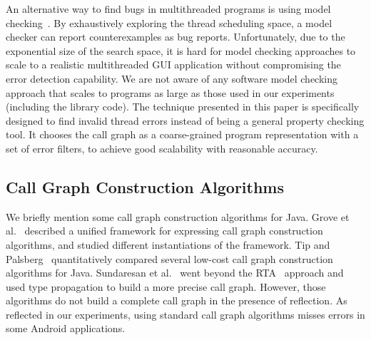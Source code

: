 An alternative way to find bugs in multithreaded programs is using model checking~\cite{Nori:2010:ESO, Inverardi:2000, Siegel:2008}.
By exhaustively exploring the thread scheduling space, a model checker can
report counterexamples as bug reports.
Unfortunately, due to the exponential size of the search space,
it is hard for model checking approaches to scale to a realistic multithreaded GUI application
 without compromising the error detection capability. 
We are not aware of any software model checking approach that scales to programs
as large as those used in our experiments (including the library code).
The technique presented in this paper is specifically designed to find invalid thread
errors instead of being a general property checking tool. 
It chooses the call graph as a coarse-grained program representation with a
set of error filters, to achieve good scalability with reasonable accuracy.


\tinystep

\subsection{Call Graph Construction Algorithms}

We briefly mention some call graph construction
algorithms for Java. Grove et al.~\cite{kcfa} described a unified
framework for expressing call graph construction algorithms, and
studied different instantiations of the framework.
Tip and Palsberg~\cite{xta} quantitatively compared
several low-cost call graph construction algorithms for Java.
Sundaresan et al.~\cite{Sundaresan:2000} went beyond the
RTA~\cite{rta} approach and used type propagation
to build a more precise call graph.  However,
those algorithms do not build a complete call graph in the presence of reflection.
As reflected in our experiments, using standard call graph algorithms
misses errors in some Android applications.


